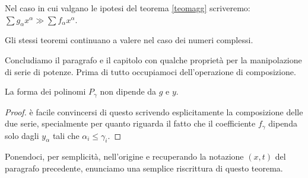 Nel caso in cui valgano le ipotesi del teorema \ref{teomagg} scriveremo:  $\sum g_\alpha x^\alpha \gg \sum f_\alpha x^\alpha$.

\begin{remark}
Gli stessi teoremi continuano a valere nel caso dei numeri complessi.
\end{remark}

Concludiamo il paragrafo e il capitolo con qualche proprietà per la manipolazione di serie di potenze. 
Prima di tutto occupiamoci dell'operazione di composizione.
\begin{theorem}
\end{theorem}
\begin{remark}
La forma dei polinomi $P_\gamma$ non dipende da $g$ e $y$.
\end{remark}
\begin{proof}
è facile convincersi di questo scrivendo esplicitamente la composizione delle due serie, specialmente per quanto riguarda il fatto che il coefficiente $f_\gamma$ dipenda solo dagli $y_\alpha$ tali che $\alpha_i \leq \gamma_i$.
\end{proof}

Ponendoci, per semplicità, nell'origine e recuperando la notazione $(x,t)$ del paragrafo precedente, enunciamo una semplice riscrittura di questo teorema.
\begin{theorem}[composizione]\label{composizione}
\end{theorem}

